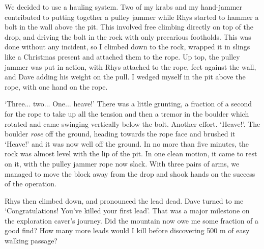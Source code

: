 	We decided to use a hauling system. Two of my krabs and my hand-jammer contributed to putting together a pulley jammer while Rhys started to hammer a bolt in the wall above the pit. This involved free climbing directly on top of the drop, and driving the bolt in the rock with only precarious footholds. This was done without any incident, so I climbed down to the rock, wrapped it in slings like a Christmas present and attached them to the rope. Up top, the pulley jammer was put in action, with Rhys attached to the rope, feet against the wall, and Dave adding his weight on the pull. I wedged myself in the pit above the rope, with one hand on the rope.

	`Three... two... One... heave!' There was a little grunting, a fraction of a second  for the rope to take up all the tension and then a tremor in the boulder which rotated and came swinging vertically below the bolt. Another effort. `Heave!'. The boulder \emph{rose} off the ground, heading towards the rope face and brushed it `Heave!' and it was now well off the ground. In no more than five minutes, the rock was almost level with the lip of the pit. In one clean motion, it came to rest on it, with the pulley jammer rope now slack. With three pairs of arms, we managed to move the block away from the drop and shook hands on the success of the operation.

	Rhys then climbed down, and pronounced the lead dead. Dave turned to me `Congratulations! You've killed your first lead'. That was a major milestone on the exploration caver's journey. Did the mountain now owe me some fraction of a good find? How many more leads would I kill before discovering 500 m of easy walking passage?

